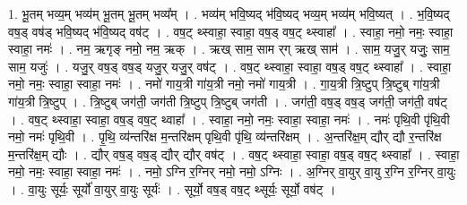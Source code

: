 \documentclass[17pt]{extarticle}
\begin{document}
1. भू॒तम् भव्य॒म् भव्य॑म् भू॒तम् भू॒तम् भव्य᳚म् । . भव्य॑म् भवि॒ष्यद् भ॑वि॒ष्यद् भव्य॒म् भव्य॑म् भवि॒ष्यत् । . भ॒वि॒ष्यद् वष॒ड् वष॑ड् भवि॒ष्यद् भ॑वि॒ष्यद् वष॑ट् । . वष॒ट् थ्स्वाहा॒ स्वाहा॒ वष॒ड् वष॒ट् थ्स्वाहा᳚ । . स्वाहा॒ नमो॒ नमः॒ स्वाहा॒ स्वाहा॒ नमः॑ । . नम॒ ऋगृङ् नमो॒ नम॒ ऋक् । . ऋख् साम॒ साम र्‌ग् ऋख् साम॑ । . साम॒ यजु॒र् यजुः॒ साम॒ साम॒ यजुः॑ । . यजु॒र् वष॒ड् वष॒ड् यजु॒र् यजु॒र् वष॑ट् । . वष॒ट् थ्स्वाहा॒ स्वाहा॒ वष॒ड् वष॒ट् थ्स्वाहा᳚ । . स्वाहा॒ नमो॒ नमः॒ स्वाहा॒ स्वाहा॒ नमः॑ । . नमो॑ गाय॒त्री गा॑य॒त्री नमो॒ नमो॑ गाय॒त्री । . गा॒य॒त्री त्रि॒ष्टुप् त्रि॒ष्टुब् गा॑य॒त्री गा॑य॒त्री त्रि॒ष्टुप् । . त्रि॒ष्टुब् जग॑ती॒ जग॑ती त्रि॒ष्टुप् त्रि॒ष्टुब् जग॑ती । . जग॑ती॒ वष॒ड् वष॒ड् जग॑ती॒ जग॑ती॒ वष॑ट् । . वष॒ट् थ्स्वाहा॒ स्वाहा॒ वष॒ड् वष॒ट् थ्वाहा᳚ । . स्वाहा॒ नमो॒ नमः॒ स्वाहा॒ स्वाहा॒ नमः॑ । . नमः॑ पृथि॒वी पृ॑थि॒वी नमो॒ नमः॑ पृथि॒वी । . पृ॒थि॒ व्य॑न्तरि॑क्ष म॒न्तरि॑क्षम् पृथि॒वी पृ॑थि॒ व्य॑न्तरि॑क्षम् । . अ॒न्तरि॑क्ष॒म् द्यौर् द्यौ र॒न्तरि॑क्ष म॒न्तरि॑क्ष॒म् द्यौः । . द्यौर् वष॒ड् वष॒ड् द्यौर् द्यौर् वष॑ट् । . वष॒ट् थ्स्वाहा॒ स्वाहा॒ वष॒ड् वष॒ट् थ्स्वाहा᳚ । . स्वाहा॒ नमो॒ नमः॒ स्वाहा॒ स्वाहा॒ नमः॑ । . नमो॒ ऽग्नि र॒ग्निर् नमो॒ नमो॒ ऽग्निः । . अ॒ग्निर् वा॒युर् वा॒यु र॒ग्नि र॒ग्निर् वा॒युः । . वा॒युः सूर्यः॒ सूर्यो॑ वा॒युर् वा॒युः सूर्यः॑ । . सूर्यो॒ वष॒ड् वष॒ट् थ्सूर्यः॒ सूर्यो॒ वष॑ट् । \newline
\end{document}
